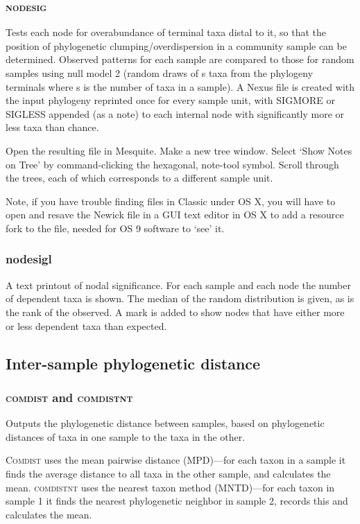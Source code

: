 \documentclass[12pt,letterpaper]{article}
\begin{document}
\subsubsection{\scshape nodesig}

Tests each node for overabundance of terminal taxa distal to it, so
that the position of phylogenetic clumping/overdispersion in a
community sample can be determined. Observed patterns for each sample
are compared to those for random samples using null model 2 (random
draws of s taxa from the phylogeny terminals where s is the number of
taxa in a sample). A Nexus file is created with the input phylogeny
reprinted once for every sample unit, with SIGMORE or SIGLESS appended
(as a note) to each internal node with significantly more or less taxa
than chance.

Open the resulting file in Mesquite. Make a new tree window. Select
`Show Notes on Tree' by command-clicking the hexagonal, note-tool
symbol. Scroll through the trees, each of which corresponds to a
different sample unit.

Note, if you have trouble finding files in Classic under OS X, you
will have to open and resave the Newick file in a GUI text editor in
OS X to add a resource fork to the file, needed for OS 9 software to
`see' it.

\subsubsection{nodesigl}

A text printout of nodal significance. For each sample and each node
the number of dependent taxa is shown. The median of the random
distribution is given, as is the rank of the observed. A mark is added
to show nodes that have either more or less dependent taxa than
expected.

\subsection{Inter-sample phylogenetic distance}

\subsubsection{{\scshape comdist} and {\scshape comdistnt}}

Outputs the phylogenetic distance between samples, based on
phylogenetic distances of taxa in one sample to
the taxa in the other.

{\scshape Comdist} uses the mean pairwise distance (MPD)---for each
taxon in a sample it finds the average distance to all taxa in the other sample, and calculates the mean.
{\scshape comdistnt} uses the nearest taxon method (MNTD)---for each
taxon in sample 1 it finds the nearest phylogenetic neighbor in sample
2, records this and calculates the mean.  
\end{document}
